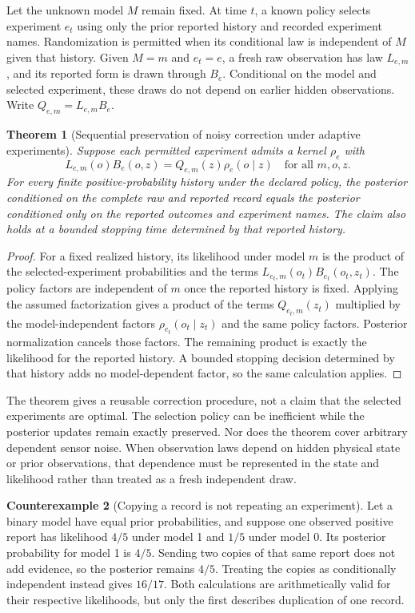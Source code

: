 \documentclass[11pt,letterpaper]{article}
\theoremstyle{plain}
\newtheorem{theorem}{Theorem}[section]
\theoremstyle{definition}
\newtheorem{counterexample}[theorem]{Counterexample}
\begin{document}
Let the unknown model $M$ remain fixed. At time $t$, a known policy selects experiment $e_t$ using only the prior reported history and recorded experiment names. Randomization is permitted when its conditional law is independent of $M$ given that history. Given $M=m$ and $e_t=e$, a fresh raw observation has law $L_{e,m}$, and its reported form is drawn through $B_e$. Conditional on the model and selected experiment, these draws do not depend on earlier hidden observations. Write $Q_{e,m}=L_{e,m}B_e$.

\begin{theorem}[Sequential preservation of noisy correction under adaptive experiments]\label{thm:adaptive-bayes}
Suppose each permitted experiment admits a kernel $\rho_e$ with
\[
L_{e,m}(o)B_e(o,z)=Q_{e,m}(z)\rho_e(o\mid z)
\quad\text{for all }m,o,z.
\]
For every finite positive-probability history under the declared policy, the posterior conditioned on the complete raw and reported record equals the posterior conditioned only on the reported outcomes and experiment names. The claim also holds at a bounded stopping time determined by that reported history.
\end{theorem}
\begin{proof}
For a fixed realized history, its likelihood under model $m$ is the product of the selected-experiment probabilities and the terms $L_{e_t,m}(o_t)B_{e_t}(o_t,z_t)$. The policy factors are independent of $m$ once the reported history is fixed. Applying the assumed factorization gives a product of the terms $Q_{e_t,m}(z_t)$ multiplied by the model-independent factors $\rho_{e_t}(o_t\mid z_t)$ and the same policy factors. Posterior normalization cancels those factors. The remaining product is exactly the likelihood for the reported history. A bounded stopping decision determined by that history adds no model-dependent factor, so the same calculation applies.
\end{proof}

The theorem gives a reusable correction procedure, not a claim that the selected experiments are optimal. The selection policy can be inefficient while the posterior updates remain exactly preserved. Nor does the theorem cover arbitrary dependent sensor noise. When observation laws depend on hidden physical state or prior observations, that dependence must be represented in the state and likelihood rather than treated as a fresh independent draw.

\begin{counterexample}[Copying a record is not repeating an experiment]\label{ex:duplicate-record}
Let a binary model have equal prior probabilities, and suppose one observed positive report has likelihood $4/5$ under model 1 and $1/5$ under model 0. Its posterior probability for model 1 is $4/5$. Sending two copies of that same report does not add evidence, so the posterior remains $4/5$. Treating the copies as conditionally independent instead gives $16/17$. Both calculations are arithmetically valid for their respective likelihoods, but only the first describes duplication of one record.
\end{counterexample}
\end{document}
